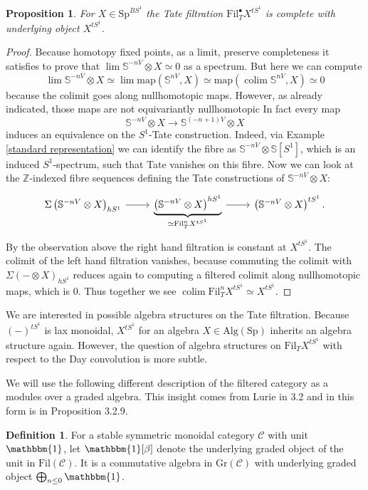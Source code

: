 \documentclass[10pt, reqno]{amsart}
\newtheorem{proposition}[theorem]{Proposition}
\theoremstyle{definition}
\newtheorem{definition}[theorem]{Definition}
\theoremstyle{remark}
\newcommand{\Z}{\mathbb{Z}}
\newcommand{\Sp}{\mathrm{Sp}}
\newcommand{\Alg}{\mathrm{Alg}}
\newcommand{\C}{\mathcal{C}}
\DeclareMathOperator{\colim}{\mathrm{colim}}
\newcommand{\Fil}{\mathrm{Fil}}
\newcommand{\map}{\mathrm{map}}
\renewcommand{\S}{\mathbb{S}}
\newcommand{\Gr}{\mathrm{Gr}}
\newcommand{\unit}{\mathbf{1}}
\renewcommand{\unit}{\mathbbm{1}}
\begin{document}
\begin{proposition}\label{convergence to tate}
	For $X\in\Sp^{BS^1}$ the Tate filtration $\Fil_T^\bullet X^{tS^1}$ is complete with underlying object $X^{tS^1}$.
\end{proposition}
\begin{proof}
	Because homotopy fixed points, as a limit, preserve completeness it satisfies to prove that $\lim \S^{-nV}\otimes X\simeq 0$ as a spectrum. But here we can compute
	\[\lim\S^{-nV}\otimes X\simeq \lim \map\left(\S^{nV},X\right)\simeq \map\left(\colim \S^{nV},X\right)\simeq 0
	\]
	because the colimit goes along nullhomotopic maps. However, as already indicated, those maps are not equivariantly nullhomotopic In fact every map
	\[\S^{-nV}\otimes X\to \S^{(-n+1)V}\otimes X\]
	induces an equivalence on the $S^1$-Tate construction. Indeed, via Example \ref{standard representation} we can identify the fibre as $\S^{-nV}\otimes \S[S^1]$, which is an induced $S^1$-spectrum, such that Tate vanishes on this fibre. Now we can look at the $\Z$-indexed fibre sequences defining the Tate constructions of $\S^{-nV}\otimes X$:
	\[\begin{tikzcd}
	\Sigma\left(\S^{-nV}\otimes X\right)_{hS^1}\ar[r]&\underbrace{\left(\S^{-nV}\otimes X\right)^{hS^1}}_{\simeq \Fil^n_TX^{tS^1}}\ar[r]&\left(\S^{-nV}\otimes X\right)^{tS^1}.
	\end{tikzcd}\]
	By the observation above the right hand filtration is constant at $X^{tS^1}$. The colimit of the left hand filtration vanishes, because commuting the colimit with $\Sigma(-\otimes X)_{hS^1}$ reduces again to computing a filtered colimit along nullhomotopic maps, which is 0. Thus together we see $\colim\Fil^n_T X^{tS^1}\simeq X^{tS^1}$. 
\end{proof}

We are interested in possible algebra structures on the Tate filtration. Because $(-)^{tS^1}$ is lax monoidal, $X^{tS^1}$ for an algebra $X\in\Alg(\Sp)$ inherits an algebra structure again. However, the question of algebra structures on $\Fil_T X^{tS^1}$ with respect to the Day convolution is more subtle.

We will use the following different description of the filtered category as a modules over a graded algebra. This insight comes from Lurie in \cite{Lur15} 3.2 and in this form is in \cite{Rak20} Proposition 3.2.9.

\begin{definition}
	For a stable symmetric monoidal category $\C$ with unit $\unit$, let $\unit[\beta]$ denote the underlying graded object of the unit in $\Fil(\C)$. It is a commutative algebra in $\Gr(\C)$ with underlying graded object $\bigoplus_{n\leq 0}\unit$. 
\end{definition}
\end{document}
